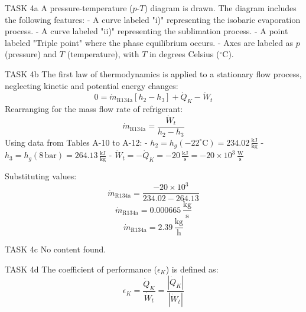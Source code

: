 TASK 4a  
A pressure-temperature (\( p \)-\( T \)) diagram is drawn. The diagram includes the following features:  
- A curve labeled "i)" representing the isobaric evaporation process.  
- A curve labeled "ii)" representing the sublimation process.  
- A point labeled "Triple point" where the phase equilibrium occurs.  
- Axes are labeled as \( p \) (pressure) and \( T \) (temperature), with \( T \) in degrees Celsius (\( ^\circ\text{C} \)).  

TASK 4b  
The first law of thermodynamics is applied to a stationary flow process, neglecting kinetic and potential energy changes:  
\[
0 = \dot{m}_{\text{R134a}} \left[ h_2 - h_3 \right] + \dot{Q}_K - \dot{W}_t
\]  
Rearranging for the mass flow rate of refrigerant:  
\[
\dot{m}_{\text{R134a}} = \frac{\dot{W}_t}{h_2 - h_3}
\]  
Using data from Tables A-10 to A-12:  
- \( h_2 = h_g(-22^\circ\text{C}) = 234.02 \, \frac{\text{kJ}}{\text{kg}} \)  
- \( h_3 = h_g(8 \, \text{bar}) = 264.13 \, \frac{\text{kJ}}{\text{kg}} \)  
- \( \dot{W}_t = -\dot{Q}_K = -20 \, \frac{\text{kJ}}{\text{s}} = -20 \times 10^3 \, \frac{\text{W}}{\text{s}} \)  

Substituting values:  
\[
\dot{m}_{\text{R134a}} = \frac{-20 \times 10^3}{234.02 - 264.13}  
\]  
\[
\dot{m}_{\text{R134a}} = 0.000665 \, \frac{\text{kg}}{\text{s}}  
\]  
\[
\dot{m}_{\text{R134a}} = 2.39 \, \frac{\text{kg}}{\text{h}}  
\]  

TASK 4c  
No content found.  

TASK 4d  
The coefficient of performance (\( \epsilon_K \)) is defined as:  
\[
\epsilon_K = \frac{\dot{Q}_K}{\dot{W}_t} = \frac{\left| \dot{Q}_K \right|}{\left| \dot{W}_t \right|}
\]  
